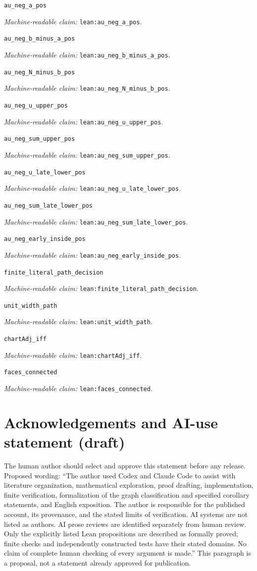 \documentclass[11pt]{amsart}
\newcommand{\record}[1]{\nolinkurl{#1}}
\newcommand{\claimid}[1]{\par\nopagebreak\noindent\textit{Machine-readable claim:} \record{#1}.\par}
\begin{document}
\par\noindent\label{lean:au_neg_a_pos}\record{au_neg_a_pos}
\claimid{lean:au_neg_a_pos}
\par\noindent\label{lean:au_neg_b_minus_a_pos}\record{au_neg_b_minus_a_pos}
\claimid{lean:au_neg_b_minus_a_pos}
\par\noindent\label{lean:au_neg_N_minus_b_pos}\record{au_neg_N_minus_b_pos}
\claimid{lean:au_neg_N_minus_b_pos}
\par\noindent\label{lean:au_neg_u_upper_pos}\record{au_neg_u_upper_pos}
\claimid{lean:au_neg_u_upper_pos}
\par\noindent\label{lean:au_neg_sum_upper_pos}\record{au_neg_sum_upper_pos}
\claimid{lean:au_neg_sum_upper_pos}
\par\noindent\label{lean:au_neg_u_late_lower_pos}\record{au_neg_u_late_lower_pos}
\claimid{lean:au_neg_u_late_lower_pos}
\par\noindent\label{lean:au_neg_sum_late_lower_pos}\record{au_neg_sum_late_lower_pos}
\claimid{lean:au_neg_sum_late_lower_pos}
\par\noindent\label{lean:au_neg_early_inside_pos}\record{au_neg_early_inside_pos}
\claimid{lean:au_neg_early_inside_pos}
\par\noindent\label{lean:finite_literal_path_decision}\record{finite_literal_path_decision}
\claimid{lean:finite_literal_path_decision}

\par\noindent\label{lean:unit_width_path}\record{unit_width_path}
\claimid{lean:unit_width_path}
\par\noindent\label{lean:chartAdj_iff}\record{chartAdj_iff}
\claimid{lean:chartAdj_iff}
\par\noindent\label{lean:faces_connected}\record{faces_connected}
\claimid{lean:faces_connected}

\section*{Acknowledgements and AI-use statement (draft)}
The human author should select and approve this statement before any
release. Proposed wording: ``The author used Codex and Claude Code
to assist with literature organization, mathematical exploration,
proof drafting, implementation, finite verification, formalization of
the graph classification and specified corollary statements, and English exposition. The author is responsible
for the published account, its provenance, and the stated limits of
verification. AI systems are not listed as authors. AI prose reviews
are identified separately from human review. Only the explicitly
listed Lean propositions are described as formally proved; finite
checks and independently constructed tests have their stated domains.
No claim of complete human checking of every argument is made.''
This paragraph is a proposal, not a statement already approved for publication.
\end{document}
